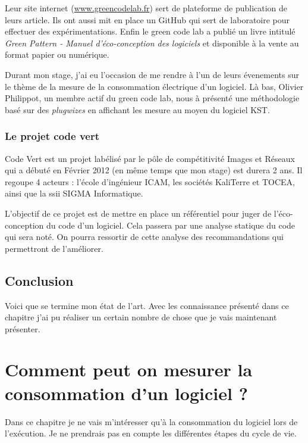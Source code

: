 \documentclass[a4paper, 11pt]{report}
\begin{document}
Leur site internet (\href{http://www.greencodelab.fr}{www.greencodelab.fr}) sert de plateforme de publication de leurs article. Ils ont aussi mit en place un GitHub qui sert de laboratoire pour effectuer des expérimentations. Enfin le green code lab a publié un livre intitulé \textit{Green Pattern - Manuel d'éco-conception des logiciels} et disponible à la vente au format papier ou numérique.

Durant mon stage, j'ai eu l'occasion de me rendre à l'un de leurs évenements sur le thème de la mesure de la consommation électrique d'un logiciel. Là bas, Olivier Philippot, un membre actif du green code lab, nous à présenté une méthodologie basé sur des \textit{plugwizes} en affichant les mesure au moyen du logiciel KST.
		\subsection{Le projet code vert}
Code Vert est un projet labélisé par le pôle de compétitivité Images et Réseaux qui a débuté en Février 2012 (en même temps que mon stage) est durera 2 ans. Il regoupe 4 acteurs : l'école d'ingénieur ICAM, les sociétés KaliTerre et TOCEA, ainsi que la ssii SIGMA Informatique.

L'objectif de ce projet est de mettre en place un référentiel pour juger de l'éco-conception du code d'un logiciel. Cela passera par une analyse statique du code qui sera noté. On pourra ressortir de cette analyse des recommandations qui permettront de l'améliorer.
		
	\section{Conclusion}
Voici que se termine mon état de l'art. Avec les connaissance présenté dans ce chapitre j'ai pu réaliser un certain nombre de chose que je vais maintenant présenter.

\chapter{Comment peut on mesurer la consommation d'un logiciel ?}
Dans ce chapitre je ne vais m'intéresser qu'à la consommation du logiciel lors de l'exécution. Je ne prendrais pas en compte les différentes étapes du cycle de vie.
\end{document}

